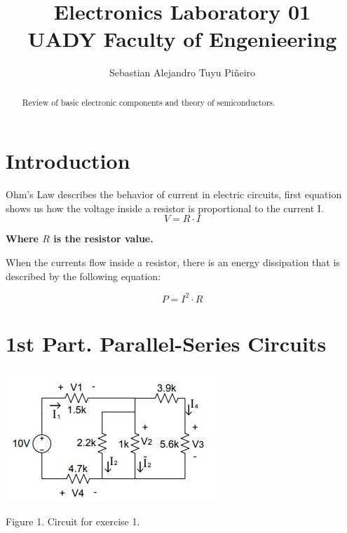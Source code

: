 \documentclass[article]{IEEEtran}
\begin{document}
\title{Electronics Laboratory 01\\
\large UADY Faculty of Engenieering}
\author{Sebastian Alejandro Tuyu Piñeiro}

\maketitle

\begin{abstract}
Review of basic electronic components and theory of semiconductors.
\end{abstract}

\section*{Introduction}

Ohm's Law describes the behavior of current in electric circuits, first equation shows us how the voltage inside a resistor is proportional to the current I. \\
\begin{equation}
    V = R \cdot I
\end{equation}

\textbf{Where $R$ is the resistor value.}

When the currents flow inside a resistor, there is an energy dissipation that is described by the following equation: 

\begin{equation}
    P = I^2 \cdot R
\end{equation}

\section*{1st Part. Parallel-Series Circuits
}
\begin{center}
\includegraphics[scale=0.95]{fig1.JPG}

Figure 1. Circuit for exercise 1.
\end{center}
\end{document}
